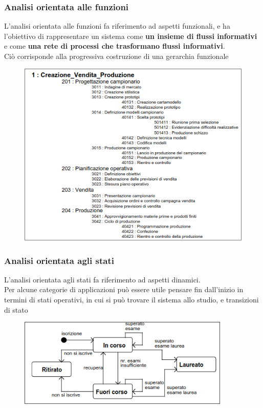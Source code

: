 \documentclass{report}
\begin{document}
                \subsubsection{Analisi orientata alle funzioni}
                    L'analisi orientata alle funzioni fa riferimento ad aspetti funzionali, e ha l'obiettivo di rappresentare un sistema come \textbf{un insieme di flussi informativi} e come \textbf{una rete di processi che trasformano flussi informativi}.
                    \\
                    Ciò corrisponde alla progressiva costruzione di una gerarchia funzionale
                    \begin{figure}[H]
                        \includegraphics[width=0.9 \textwidth]{img/af.png}
                    \end{figure}
                \subsubsection{Analisi orientata agli stati}
                    L'analisi orientata agli stati fa riferimento ad aspetti dinamici.
                    \\
                    Per alcune categorie di applicazioni può essere utile pensare fin dall'inizio in termini di stati operativi, in cui si può trovare il sistema allo studio, e transizioni di stato
                    \begin{figure}[H]
                        \includegraphics[width=0.9\textwidth]{img/as.png}
                    \end{figure}
\end{document}
